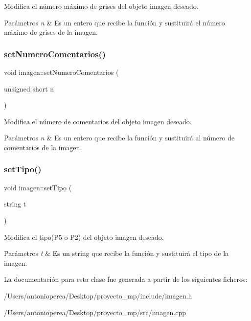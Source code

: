 Modifica el número máximo de grises del objeto imagen deseado. 
\begin{DoxyParams}{Parámetros}
{\em n} & Es un entero que recibe la función y sustituirá el número máximo de grises de la imagen. \\
\hline
\end{DoxyParams}
\mbox{\label{classimagen_a3d382c3cc56a3427f5cadf2b63cb6177}} 
\subsubsection{\texorpdfstring{set\+Numero\+Comentarios()}{setNumeroComentarios()}}
{\footnotesize\ttfamily void imagen\+::set\+Numero\+Comentarios (\begin{DoxyParamCaption}\item[{unsigned short}]{n }\end{DoxyParamCaption})}

Modifica el número de comentarios del objeto imagen deseado. 
\begin{DoxyParams}{Parámetros}
{\em n} & Es un entero que recibe la función y sustituirá al número de comentarios de la imagen. \\
\hline
\end{DoxyParams}
\mbox{\label{classimagen_a6b714d47d961cfe6da7839741241fc74}} 
\subsubsection{\texorpdfstring{set\+Tipo()}{setTipo()}}
{\footnotesize\ttfamily void imagen\+::set\+Tipo (\begin{DoxyParamCaption}\item[{string}]{t }\end{DoxyParamCaption})}

Modifica el tipo(\+P5 o P2) del objeto imagen deseado. 
\begin{DoxyParams}{Parámetros}
{\em t} & Es un string que recibe la función y sustituirá el tipo de la imagen. \\
\hline
\end{DoxyParams}


La documentación para esta clase fue generada a partir de los siguientes ficheros\+:\begin{DoxyCompactItemize}
\item 
/\+Users/antonioperea/\+Desktop/proyecto\+\_\+mp/include/imagen.\+h\item 
/\+Users/antonioperea/\+Desktop/proyecto\+\_\+mp/src/imagen.\+cpp\end{DoxyCompactItemize}
